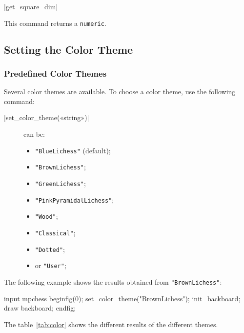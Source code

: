 \documentclass[english]{ltxdoc}
\begin{document}
\commande|get_square_dim|\smallskip{}

This command returns a \lstinline+numeric+.

\subsection{Setting the Color Theme}

\subsubsection{Predefined Color Themes}

Several color themes are available. To choose a color theme, use the following
command:

\commande|set_color_theme(«string»)|\smallskip{}

\begin{description}
  \item[] can be:
\begin{itemize}
\item \lstinline+"BlueLichess"+ (default);
\item \lstinline+"BrownLichess"+;
\item \lstinline+"GreenLichess"+;
\item \lstinline+"PinkPyramidalLichess"+;
\item \lstinline+"Wood"+;
\item \lstinline+"Classical"+;
\item \lstinline+"Dotted"+;
\item or \lstinline+"User"+;
\end{itemize}
\end{description}

The following example shows the results obtained from \lstinline+"BrownLichess"+:
\begin{ExempleMP}
input mpchess
beginfig(0);
set_color_theme("BrownLichess");
init_backboard;
draw backboard;
endfig;
\end{ExempleMP}

The table~\ref{tab:color} shows the different results of the different themes. 
\end{document}
